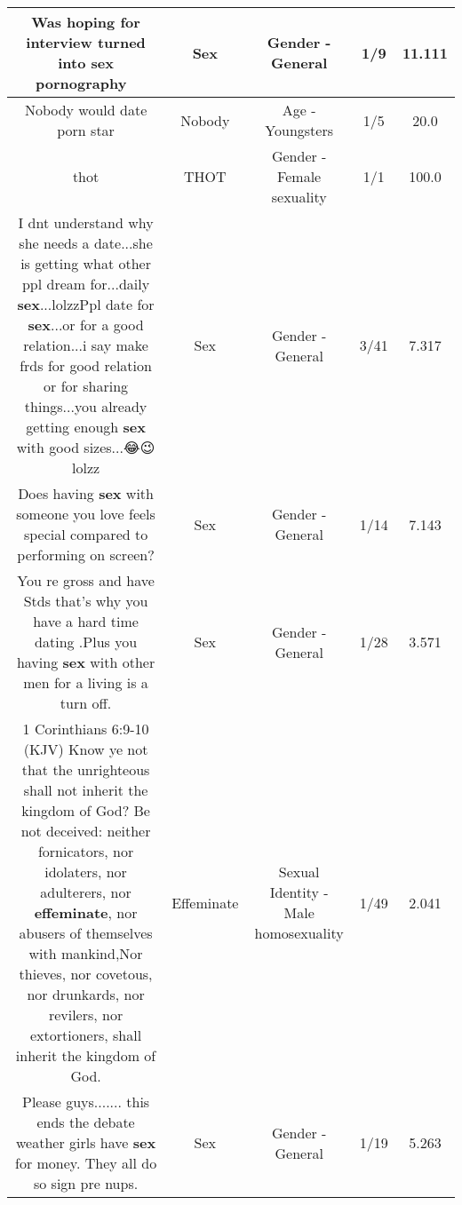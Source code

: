 \documentclass[11pt]{article}
\newlength\mylength
\begin{document}
\begin{center}
\begin{longtable}{|C{.65\mylength}|C{.30\mylength}|C{.12\mylength}|C{.12\mylength}|C{.12\mylength}|}
  \small Was hoping for interview turned into \textbf{sex} pornography 🤣\normalsize   & Sex & Gender - General & 1/9 & 11.111 \\  \hline
  \small Nobody would date porn star\normalsize   & Nobody & Age - Youngsters & 1/5 & 20.0 \\  \hline
  \small thot\normalsize   & THOT & Gender - Female sexuality & 1/1 & 100.0 \\  \hline
  \small I dnt understand why she needs a date...she is getting what other ppl dream for...daily \textbf{sex}...lolzzPpl date for \textbf{sex}...or for a good relation...i say make frds for good relation or for sharing things...you already getting enough \textbf{sex} with good sizes...😂😉lolzz\normalsize   & Sex & Gender - General & 3/41 & 7.317 \\  \hline
  \small Does having \textbf{sex} with someone you love feels special compared to performing on screen?\normalsize   & Sex & Gender - General & 1/14 & 7.143 \\  \hline
  \small You re gross and have Stds that's why you have a hard time dating .Plus you having \textbf{sex} with other men for a living is a turn off.\normalsize   & Sex & Gender - General & 1/28 & 3.571 \\  \hline
  \small 1 Corinthians 6:9-10 (KJV) Know ye not that the unrighteous shall not inherit the kingdom of God? Be not deceived: neither fornicators, nor idolaters, nor adulterers, nor \textbf{effeminate}, nor abusers of themselves with mankind,Nor thieves, nor covetous, nor drunkards, nor revilers, nor extortioners, shall inherit the kingdom of God.\normalsize   & Effeminate & Sexual Identity - Male homosexuality & 1/49 & 2.041 \\  \hline
  \small Please guys....... this ends the debate weather girls have \textbf{sex} for money.  They all do so sign pre nups.\normalsize   & Sex & Gender - General & 1/19 & 5.263 \\  \hline

\end{longtable}
\end{center}
\end{document}
